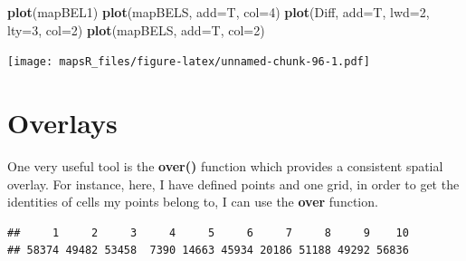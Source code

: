 \documentclass[]{report}
\newenvironment{Shaded}{\begin{snugshade}}{\end{snugshade}}
\newcommand{\CommentTok}[1]{\textcolor[rgb]{0.56,0.35,0.01}{\textit{#1}}}
\newcommand{\DataTypeTok}[1]{\textcolor[rgb]{0.13,0.29,0.53}{#1}}
\newcommand{\DecValTok}[1]{\textcolor[rgb]{0.00,0.00,0.81}{#1}}
\newcommand{\KeywordTok}[1]{\textcolor[rgb]{0.13,0.29,0.53}{\textbf{#1}}}
\newcommand{\NormalTok}[1]{#1}
\begin{document}
\begin{Shaded}
\begin{Highlighting}[]
\KeywordTok{plot}\NormalTok{(mapBEL1)}
\KeywordTok{plot}\NormalTok{(mapBELS, }\DataTypeTok{add=}\NormalTok{T, }\DataTypeTok{col=}\DecValTok{4}\NormalTok{)}
\KeywordTok{plot}\NormalTok{(Diff, }\DataTypeTok{add=}\NormalTok{T, }\DataTypeTok{lwd=}\DecValTok{2}\NormalTok{, }\DataTypeTok{lty=}\DecValTok{3}\NormalTok{, }\DataTypeTok{col=}\DecValTok{2}\NormalTok{)}
\KeywordTok{plot}\NormalTok{(mapBELS, }\DataTypeTok{add=}\NormalTok{T, }\DataTypeTok{col=}\DecValTok{2}\NormalTok{)}
\end{Highlighting}
\end{Shaded}

\texttt{[image: mapsR\_files/figure-latex/unnamed-chunk-96-1.pdf]}

\hypertarget{overlays}{%
\section{Overlays}\label{overlays}}

One very useful tool is the \textbf{over()} function which provides a
consistent spatial overlay. For instance, here, I have defined points
and one grid, in order to get the identities of cells my points belong
to, I can use the \textbf{over} function.

\begin{Shaded}
\end{Shaded}

\begin{verbatim}
##     1     2     3     4     5     6     7     8     9    10 
## 58374 49482 53458  7390 14663 45934 20186 51188 49292 56836
\end{verbatim}
\end{document}
